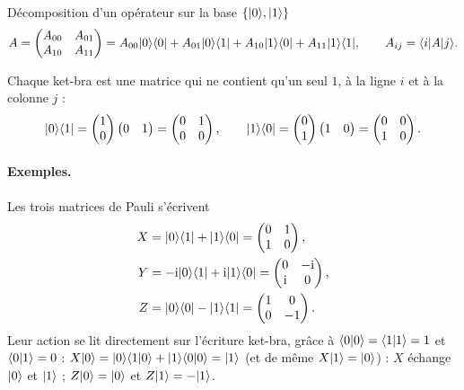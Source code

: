 \begin{definition}{Décomposition d'un opérateur sur la base $\{|0\rangle,|1\rangle\}$}
\[
  A=\begin{pmatrix}A_{00} & A_{01}\\ A_{10} & A_{11}\end{pmatrix}
  =A_{00}|0\rangle\langle 0|+A_{01}|0\rangle\langle 1|+A_{10}|1\rangle\langle 0|+A_{11}|1\rangle\langle 1|,
  \qquad A_{ij}=\langle i|A|j\rangle.
\]
\end{definition}

Chaque ket-bra est une matrice qui ne contient qu'un seul $1$, à la ligne $i$ et à la
colonne $j$ :
\[
  |0\rangle\langle 1|=\begin{pmatrix}1\\ 0\end{pmatrix}\begin{pmatrix}0 & 1\end{pmatrix}
  =\begin{pmatrix}0 & 1\\ 0 & 0\end{pmatrix},
  \qquad
  |1\rangle\langle 0|=\begin{pmatrix}0\\ 1\end{pmatrix}\begin{pmatrix}1 & 0\end{pmatrix}
  =\begin{pmatrix}0 & 0\\ 1 & 0\end{pmatrix}.
\]

\paragraph{Exemples.} Les trois matrices de Pauli s'écrivent
\begin{align*}
  X&=|0\rangle\langle 1|+|1\rangle\langle 0|=\begin{pmatrix}0 & 1\\ 1 & 0\end{pmatrix},\\
  Y&=-\mathrm{i}|0\rangle\langle 1|+\mathrm{i}|1\rangle\langle 0|=\begin{pmatrix}0 & -\mathrm{i}\\ \mathrm{i} & 0\end{pmatrix},\\
  Z&=|0\rangle\langle 0|-|1\rangle\langle 1|=\begin{pmatrix}1 & 0\\ 0 & -1\end{pmatrix}.
\end{align*}
Leur action se lit directement sur l'écriture ket-bra, grâce à
$\langle 0|0\rangle=\langle 1|1\rangle=1$ et $\langle 0|1\rangle=0$ :
$X|0\rangle=|0\rangle\langle 1|0\rangle+|1\rangle\langle 0|0\rangle=|1\rangle$ (et de même $X|1\rangle=|0\rangle$) :
$X$ échange $|0\rangle$ et $|1\rangle$ ; $Z|0\rangle=|0\rangle$ et $Z|1\rangle=-|1\rangle$.

